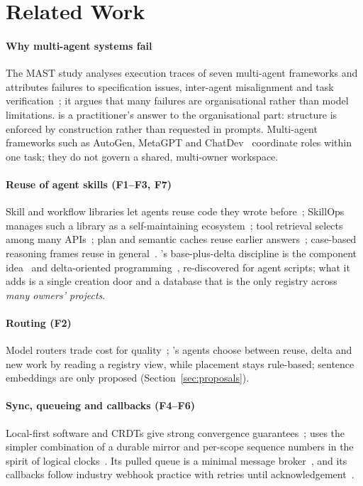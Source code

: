 \section{Related Work}\label{sec:related}
\paragraph*{Why multi-agent systems fail} The MAST study analyses execution traces of seven multi-agent frameworks and attributes failures to specification issues, inter-agent misalignment and task verification~\cite{cemri2025mast}; it argues that many failures are organisational rather than model limitations. \sys{} is a practitioner's answer to the organisational part: structure is enforced by construction rather than requested in prompts. Multi-agent frameworks such as AutoGen, MetaGPT and ChatDev~\cite{wu2023autogen,hong2024metagpt,qian2024chatdev} coordinate roles within one task; they do not govern a shared, multi-owner workspace.

\paragraph*{Reuse of agent skills (F1--F3, F7)} Skill and workflow libraries let agents reuse code they wrote before~\cite{wang2023voyager,wang2024awm,wang2025asi,yu2026polyskill}; SkillOps manages such a library as a self-maintaining ecosystem~\cite{pu2026skillops}; tool retrieval selects among many APIs~\cite{patil2024gorilla}; plan and semantic caches reuse earlier answers~\cite{zhang2025apc,fu2023gptcache,gill2025meancache}; case-based reasoning frames reuse in general~\cite{aamodt1994cbr,hatalis2025cbr}. \sys's base-plus-delta discipline is the component idea~\cite{mcilroy1968components,react} and delta-oriented programming~\cite{schaefer2010delta}, re-discovered for agent scripts; what it adds is a single creation door and a database that is the only registry across \emph{many owners' projects}.

\paragraph*{Routing (F2)} Model routers trade cost for quality~\cite{ong2025routellm}; \sys{}'s agents choose between reuse, delta and new work by reading a registry view, while placement stays rule-based; sentence embeddings are only proposed (Section~\ref{sec:proposals}).

\paragraph*{Sync, queueing and callbacks (F4--F6)} Local-first software and CRDTs give strong convergence guarantees~\cite{kleppmann2019localfirst}; \sys{} uses the simpler combination of a durable mirror and per-scope sequence numbers in the spirit of logical clocks~\cite{lamport1978time}. Its pulled queue is a minimal message broker~\cite{vinoski2006amqp}, and its callbacks follow industry webhook practice with retries until acknowledgement~\cite{stripewebhooks}.

